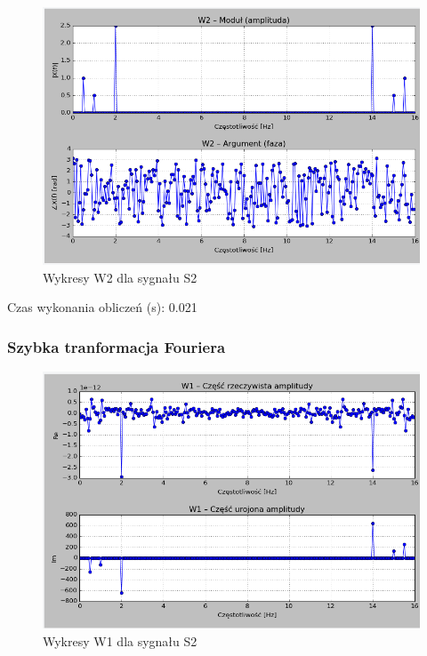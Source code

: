\documentclass{article}
\begin{document}
{                \begin{figure}[h!]
                    \centering
                    \includegraphics[width=1\textwidth]{img/w2s2.png}
                    \caption{Wykresy W2 dla sygnału S2}
                \end{figure}
                \FloatBarrier

                Czas wykonania obliczeń (s): 0.021

        \subsubsection{Szybka tranformacja Fouriera}

                \FloatBarrier
                \begin{figure}[h!]
                    \centering
                    \includegraphics[width=1\textwidth]{img/w1s2_2.png}
                    \caption{Wykresy W1 dla sygnału S2}
                \end{figure}

}
\end{document}

